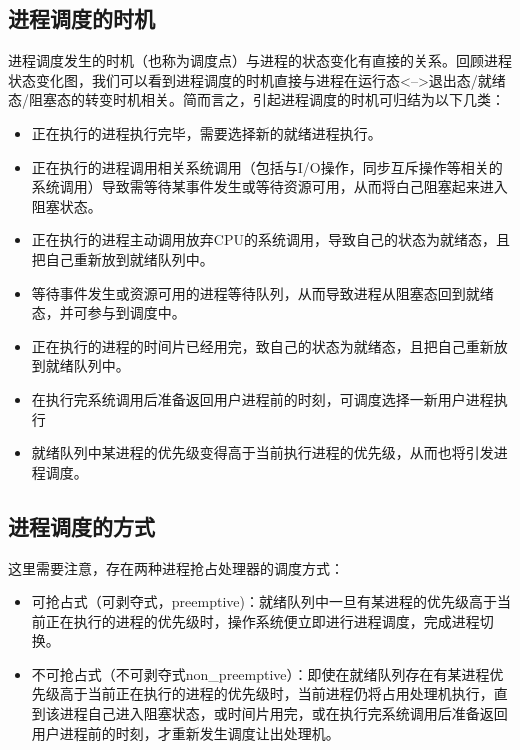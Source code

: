 \subsection{进程调度的时机}\label{ux8fdbux7a0bux8c03ux5ea6ux7684ux65f6ux673a}

进程调度发生的时机（也称为调度点）与进程的状态变化有直接的关系。回顾进程状态变化图，我们可以看到进程调度的时机直接与进程在运行态\textless{}--\textgreater{}退出态/就绪态/阻塞态的转变时机相关。简而言之，引起进程调度的时机可归结为以下几类：

\begin{itemize}
\tightlist
\item
  正在执行的进程执行完毕，需要选择新的就绪进程执行。
\item
  正在执行的进程调用相关系统调用（包括与I/O操作，同步互斥操作等相关的系统调用）导致需等待某事件发生或等待资源可用，从而将白己阻塞起来进入阻塞状态。
\item
  正在执行的进程主动调用放弃CPU的系统调用，导致自己的状态为就绪态，且把自己重新放到就绪队列中。
\item
  等待事件发生或资源可用的进程等待队列，从而导致进程从阻塞态回到就绪态，并可参与到调度中。
\item
  正在执行的进程的时间片已经用完，致自己的状态为就绪态，且把自己重新放到就绪队列中。
\item
  在执行完系统调用后准备返回用户进程前的时刻，可调度选择一新用户进程执行
\item
  就绪队列中某进程的优先级变得高于当前执行进程的优先级，从而也将引发进程调度。
\end{itemize}

\subsection{进程调度的方式}\label{ux8fdbux7a0bux8c03ux5ea6ux7684ux65b9ux5f0f}

这里需要注意，存在两种进程抢占处理器的调度方式：

\begin{itemize}
\tightlist
\item
  可抢占式（可剥夺式，preemptive)：就绪队列中一旦有某进程的优先级高于当前正在执行的进程的优先级时，操作系统便立即进行进程调度，完成进程切换。
\item
  不可抢占式（不可剥夺式non\_preemptive）：即使在就绪队列存在有某进程优先级高于当前正在执行的进程的优先级时，当前进程仍将占用处理机执行，直到该进程自己进入阻塞状态，或时间片用完，或在执行完系统调用后准备返回用户进程前的时刻，才重新发生调度让出处理机。
\end{itemize}

